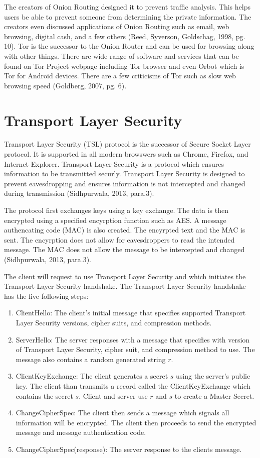 \documentclass[12pt]{article}
\begin{document}
The creators of Onion Routing designed it to prevent traffic analysis. This helps users be able to prevent someone from determining the private information. The creators even discussed applications of Onion Routing such as email, web browsing, digital cash, and a few others (Reed, Syverson, Goldschag, 1998, pg. 10). Tor is the successor to the Onion Router and can be used for browsing along with other things. There are wide range of software and services that can be found on Tor Project webpage including Tor browser and even Orbot which is Tor for Android devices. There are a few criticisms of Tor such as slow web browsing speed (Goldberg, 2007, pg. 6).


\section{Transport Layer Security}\label{sec:tls}

Transport Layer Security (TSL) protocol is the successor of Secure Socket Layer protocol. It is supported in all modern browswers such as Chrome, Firefox, and Internet Explorer. Transport Layer Security is a protocol which ensures information to be transmitted securly. Transport Layer Security is designed to prevent eavesdropping and ensures information is not intercepted and changed during transmission (Sidhpurwala, 2013, para.3).

The protocol first exchanges keys using a key exchange. The data is then encrypted using a specified encyrption function such as AES. A message authencating code (MAC) is also created. The encyrpted text and the MAC is sent. The encyrption does not allow for eavesdroppers to read the intended message. The MAC does not allow the message to be intercepted and changed (Sidhpurwala, 2013, para.3).

The client will request to use Transport Layer Security and which initiates the Transport Layer Security handshake. The Transport Layer Security handshake has the five following steps:
\begin{enumerate}
	\item ClientHello: The client's initial message that specifies supported Transport Layer Security versions, cipher suits, and compression methods. 
	\item ServerHello: The server responses with a message that specifies with version of Transport Layer Security, cipher suit, and compression method to use. The message also contains a random generated string $r$.
	\item ClientKeyExchange: The client generates a secret $s$ using the server's public key. The client than transmits a record called the ClientKeyExchange which contains the secret $s$. Client and server use $r$ and $s$ to create a Master Secret. 
	\item ChangeCipherSpec: The client then sends a message which signals all information will be encrypted. The client then proceeds to send the encrypted message and message authentication code. 
	\item ChangeCipherSpec(response): The server response to the clients message.
\end{enumerate}
\end{document}
